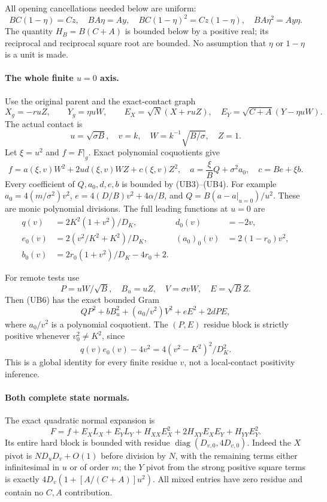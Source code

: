 All opening cancellations needed below are uniform:
\[
 BC(1-\eta)=Cz,\quad BA\eta=Ay,\quad
 BC(1-\eta)^2=Cz(1-\eta),\quad BA\eta^2=Ay\eta.
                                                               \tag{UB4}
\]
The quantity $H_B=B(C+A)$ is bounded below by a positive real;
its reciprocal and reciprocal square root are bounded.  No
assumption that $\eta$ or $1-\eta$ is a unit is made.

\paragraph{The whole finite $u=0$ axis.}
Use the original parent and the exact-contact graph
\[
 X_g=-ruZ,\qquad Y_g=\eta uW,
 \qquad E_X=\sqrt N(X+ruZ),\quad
 E_Y=\sqrt{C+A}(Y-\eta uW).                          \tag{UB5}
\]
The actual contact is
\[
 u=\sqrt{\sigma B},\quad v=k,\quad
 W=k^{-1}\sqrt{B/\sigma},\quad Z=1.
\]
Let $\xi=u^2$ and $f=F|_g$.  Exact polynomial coquotients give
\[
 f=a(\xi,v)W^2+2u d(\xi,v)WZ+c(\xi,v)Z^2,
 \quad a=\frac\xi B Q+\sigma^2a_0,\quad c=B e+\xi b.
                                                               \tag{UB6}
\]
Every coefficient of $Q,a_0,d,e,b$ is bounded by (UB3)--(UB4).
For example $a_0=4(m/\sigma^2)v^2$,
$e=4(D/B)v^2+4\alpha/B$, and
$Q=B(a-a|_{u=0})/u^2$.  These are monic polynomial divisions.
The full leading functions at $u=0$ are
\begin{align*}
 q(v)&=2K^2(1+v^2)/D_K,& d_0(v)&=-2v,\\
 e_0(v)&=2(v^2/K^2+K^2)/D_K,&
 (a_0)_0(v)&=2(1-r_0)v^2,\\
 b_0(v)&=2r_0(1+v^2)/D_K-4r_0+2.                  \tag{UB7}
\end{align*}

For remote tests use
\[
 P=uW/\sqrt B,\quad B_u=uZ,\quad
 V=\sigma vW,\quad E=\sqrt B Z.
\]
Then (UB6) has the exact bounded Gram
\[
 QP^2+b B_u^2+(a_0/v^2)V^2+eE^2+2dPE,             \tag{UB8}
\]
where $a_0/v^2$ is a polynomial coquotient.  The $(P,E)$ residue
block is strictly positive whenever $v_0^2\ne K^2$, since
\[
 q(v)e_0(v)-4v^2=4(v^2-K^2)^2/D_K^2.               \tag{UB9}
\]
This is a global identity for every finite residue $v$, not a
local-contact positivity inference.

\paragraph{Both complete state normals.}
The exact quadratic normal expansion is
\[
 F=f+E_X L_X+E_Y L_Y+H_{XX}E_X^2
                       +2H_{XY}E_XE_Y+H_{YY}E_Y^2.
                                                               \tag{UB10}
\]
Its entire hard block is bounded with residue
$\operatorname{diag}(D_{v,0},4D_{v,0})$.
Indeed the $X$ pivot is $ND_uD_v+O(1)$ before division by $N$,
with the remaining terms either infinitesimal in $u$ or of order
$m$; the $Y$ pivot from the strong positive square terms is exactly
$4D_v(1+[A/(C+A)]u^2)$.  All mixed entries have zero residue and
contain no $C,A$ contribution.

